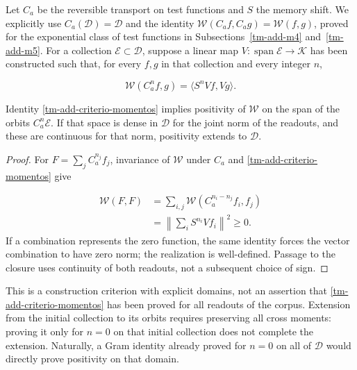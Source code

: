 Let \(C_a\) be the reversible transport on test functions and \(S\) the memory shift. We explicitly use \(C_a(\mathcal D)=\mathcal D\) and the identity \(\mathscr W(C_af,C_ag)=\mathscr W(f,g)\), proved for the exponential class of test functions in Subsections~\ref{tm-add-m4} and~\ref{tm-add-m5}. For a collection \(\mathcal E\subset\mathcal D\), suppose a linear map \(V:\operatorname{span}\mathcal E\to\mathcal K\) has been constructed such that, for every \(f,g\) in that collection and every integer \(n\),

\begin{equation}
\boxed{\mathscr W(C_a^n f,g)=\langle S^nVf,Vg\rangle.}
\label{tm-add-criterio-momentos}
\end{equation}
\begin{proposition}
\label{tm-add-proposicion-costura-3}
Identity \eqref{tm-add-criterio-momentos} implies positivity of \(\mathscr W\) on the span of the orbits \(C_a^n\mathcal E\). If that space is dense in \(\mathcal D\) for the joint norm of the readouts, and these are continuous for that norm, positivity extends to \(\mathcal D\).
\end{proposition}

\begin{proof}
For \(F=\sum_j C_a^{n_j}f_j\), invariance of \(\mathscr W\) under \(C_a\) and \eqref{tm-add-criterio-momentos} give

\[
\begin{aligned}
\mathscr W(F,F)
&=\sum_{i,j}\mathscr W(C_a^{n_i-n_j}f_i,f_j)\\
&=\left\|\sum_i S^{n_i}Vf_i\right\|^2\geq0.
\end{aligned}
\]
If a combination represents the zero function, the same identity forces the vector combination to have zero norm; the realization is well-defined. Passage to the closure uses continuity of both readouts, not a subsequent choice of sign.
\end{proof}

This is a construction criterion with explicit domains, not an assertion that \eqref{tm-add-criterio-momentos} has been proved for all readouts of the corpus. Extension from the initial collection to its orbits requires preserving all cross moments: proving it only for \(n=0\) on that initial collection does not complete the extension. Naturally, a Gram identity already proved for \(n=0\) on all of \(\mathcal D\) would directly prove positivity on that domain.


